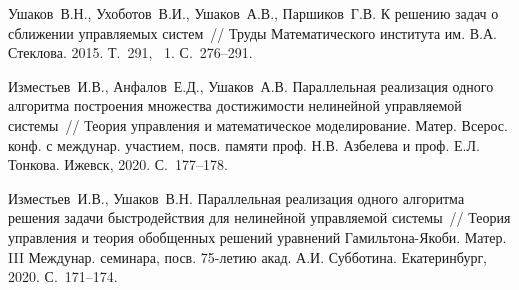\begin{thebibliography}{9} %

 Ушаков~В.Н., Ухоботов~В.И., Ушаков~А.В., Паршиков~Г.В.  К решению задач о сближении управляемых систем~// Труды Математического института им. В.А. Стеклова. 2015. Т.~291, \textnumero~1. С.~276--291.

 Изместьев~И.В., Анфалов~Е.Д., Ушаков~А.В. Параллельная реализация одного алгоритма построения множества достижимости нелинейной управляемой системы~//  Теория управления и математическое моделирование. Матер. Всерос. конф. с междунар. участием, посв. памяти проф. Н.В. Азбелева и проф. Е.Л. Тонкова.  Ижевск, 2020. С.~177--178.

 Изместьев~И.В., Ушаков~В.Н. Параллельная реализация одного алгоритма решения задачи быстродействия для нелинейной управляемой системы~// Теория управления и теория обобщенных решений уравнений Гамильтона-Якоби. Матер. III Междунар. семинара, посв. 75-летию акад. А.И. Субботина. Екатеринбург, 2020. С.~171--174.

\end{thebibliography}





%

